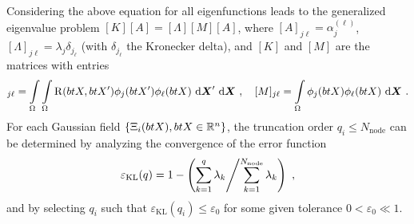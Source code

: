 Considering the above equation for all eigenfunctions leads to the generalized eigenvalue problem $[K] [A] = [\Lambda] [M] [A]$, where $[A]_{j\ell} = \alpha_j^{(\ell)}$, $[\Lambda]_{j\ell} = \lambda_j \delta_{j_\ell}$ (with $\delta_{j_\ell}$ the Kronecker delta), and $[K]$ and $[M]$ are the matrices with entries
\begin{align}
  [K]_{j\ell} = \int\limits_\body \int\limits_\body \cor(btX,btX') \phi_j(btX')\phi_\ell(btX) \diff{\bfX}' \diff{\bfX}~, \quad [M]_{j\ell} = \int\limits_\body \phi_j(btX)\phi_\ell(btX) \diff{\bfX}~.
\end{align}
For each Gaussian field $\{\Xi_i(btX), btX \in \mathbb{R}^n\}$, the truncation order $q_i \leqslant N_{\text{node}}$ can be determined by analyzing the convergence of the error function
\begin{align}
  \varepsilon_{\text{KL}}(q) = 1-\left( \sum\limits_{k=1}^q \lambda_k \middle/ \sum\limits_{k=1}^{N_\text{node}} \lambda_k \right)~, \label{eq: truncation}
\end{align}
and by selecting $q_i$ such that $\varepsilon_{\text{KL}}(q_i) \leqslant \varepsilon_0$ for some given tolerance $0 < \varepsilon_0 \ll 1$.
